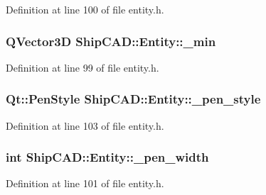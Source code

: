 Definition at line 100 of file entity.\-h.

\hypertarget{classShipCAD_1_1Entity_a414d4ff1ee308d47a5052910c3b34f7b}{
\subsubsection[{\-\_\-min}]{\setlength{\rightskip}{0pt plus 5cm}Q\-Vector3\-D Ship\-C\-A\-D\-::\-Entity\-::\-\_\-min\hspace{0.3cm}{\ttfamily [protected]}}}\label{classShipCAD_1_1Entity_a414d4ff1ee308d47a5052910c3b34f7b}


Definition at line 99 of file entity.\-h.

\hypertarget{classShipCAD_1_1Entity_ac53123be976cd9739ad1657573d67d97}{
\subsubsection[{\-\_\-pen\-\_\-style}]{\setlength{\rightskip}{0pt plus 5cm}Qt\-::\-Pen\-Style Ship\-C\-A\-D\-::\-Entity\-::\-\_\-pen\-\_\-style\hspace{0.3cm}{\ttfamily [protected]}}}\label{classShipCAD_1_1Entity_ac53123be976cd9739ad1657573d67d97}


Definition at line 103 of file entity.\-h.

\hypertarget{classShipCAD_1_1Entity_a5a9892a0d84d2cfdcd3a5dabf662a595}{
\subsubsection[{\-\_\-pen\-\_\-width}]{\setlength{\rightskip}{0pt plus 5cm}int Ship\-C\-A\-D\-::\-Entity\-::\-\_\-pen\-\_\-width\hspace{0.3cm}{\ttfamily [protected]}}}\label{classShipCAD_1_1Entity_a5a9892a0d84d2cfdcd3a5dabf662a595}


Definition at line 101 of file entity.\-h.



